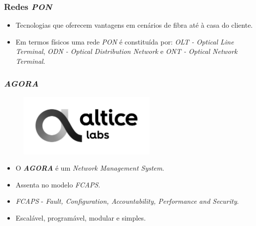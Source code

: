 \begin{frame}
    \frametitle{Redes \textit{PON}}
    \begin{itemize}
        \item Tecnologias que oferecem vantagens em cenários de fibra até à casa do cliente.
        \item Em termos físicos uma rede \textit{PON} é constituída por:
        \textit{OLT - Optical Line Terminal}, \textit{ODN - Optical Distribution
        Network} e \textit{ONT - Optical Network Terminal}.
    \end{itemize}
\end{frame}


\begin{frame}
    \frametitle{\textit{\textbf{AGORA}}}
    \begin{figure}
        \includegraphics[width=0.6\textwidth]{./assets/estado_de_arte/alticelabs_logo.png}
    \end{figure}    
    \begin{itemize}
        \item O \textit{\textbf{AGORA}} é um \textit{Network Management System}.
        \item Assenta no modelo \textit{FCAPS}.
        \item \textit{FCAPS} - \textit{Fault, Configuration, Accountability,
        Performance and Security}.
        \item Escalável, programável, modular e simples.
    \end{itemize}    
\end{frame}    

